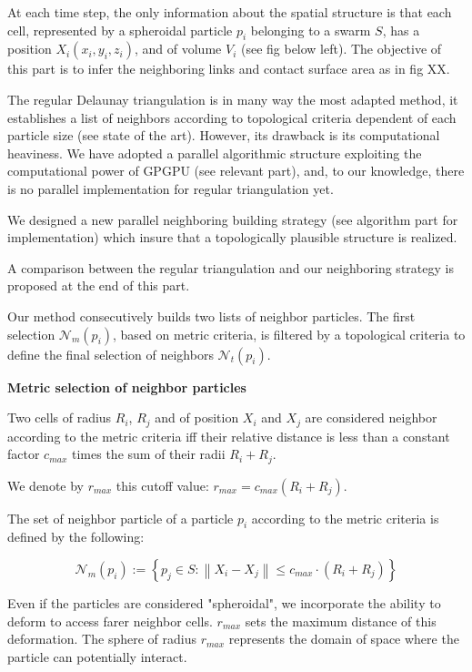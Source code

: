At each time step, the only information about the spatial structure is that each cell, represented by a spheroidal particle $p_i$ belonging to a swarm $S$, has a position $X_i (x_i,y_i,z_i)$, and of volume $V_i$ (see fig below left). The objective of this part is to infer the neighboring links and contact surface area as in fig XX.

The regular Delaunay triangulation is in many way the most adapted method, it establishes a list of neighbors according to topological criteria dependent of each particle size (see state of the art). However, its drawback is its computational heaviness. We have adopted a parallel algorithmic structure exploiting the computational power of GPGPU (see relevant part), and, to our knowledge, there is no parallel implementation for regular triangulation yet.

We designed a new parallel neighboring building strategy (see algorithm part for implementation) which insure that a topologically plausible structure is realized.

A comparison between the regular triangulation and our neighboring strategy is proposed at the end of this part.

Our method consecutively builds two lists of neighbor particles. The first selection $\mathcal{N}_m (p_i)$, based on metric criteria, is filtered by a topological criteria to define the final selection of neighbors $\mathcal{N}_t (p_i)$.

\textbf{Metric selection of neighbor particles}

Two cells of radius $R_i$, $R_j$ and of position $X_i$ and $X_j$ are considered neighbor according to the metric criteria iff their relative distance is less than a constant factor $c_{max}$ times the sum of their radii $R_i+R_j$.

We denote by $r_{max}$ this cutoff value: $r_{max} = c_{max} (R_i+R_j)$.

The set of neighbor particle of a particle $p_i$ according to the metric criteria is defined by the following:

$$\mathcal{N}_m (p_i) := \left \{  p_j \in S : \left \|  X_i - X_j \right \| \leq c_{max} \cdot (R_i+R_j) \right \} $$

Even if the particles are considered "spheroidal", we incorporate the ability to deform to access farer neighbor cells. $r_{max}$ sets the maximum distance of this deformation. The sphere of radius $r_{max}$ represents the domain of space where the particle can potentially interact.

